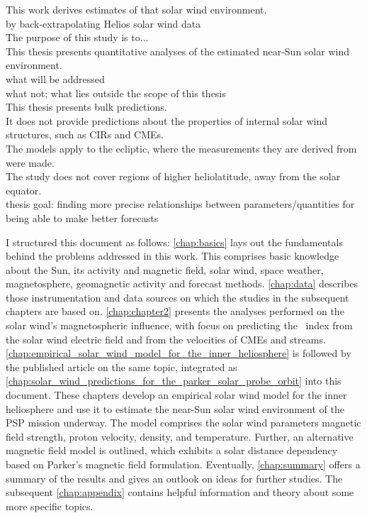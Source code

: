 
This work derives estimates of that solar wind environment.\\

by back-extrapolating Helios solar wind data\\



The purpose of this study is to...\\
This thesis presents quantitative analyses of the estimated near-Sun solar wind environment.\\

what will be addressed\\
what not; what lies outside the scope of this thesis\\
This thesis presents bulk predictions.\\
It does not provide predictions about the properties of internal solar wind structures, such as CIRs and CMEs.\\
The models apply to the ecliptic, where the measurements they are derived from were made.\\
The study does not cover regions of higher heliolatitude, away from the solar equator.\\



thesis goal: finding more precise relationships between parameters/quantities for being able to make better forecasts\\


\bigskip

I structured this document as follows: \autoref{chap:basics} lays out the fundamentals behind the problems addressed in this work. This comprises basic knowledge about the Sun, its activity and magnetic field, solar wind, space weather, magnetosphere, geomagnetic activity and forecast methods. \autoref{chap:data} describes those instrumentation and data sources on which the studies in the subsequent chapters are based on. \autoref{chap:chapter2} presents the analyses performed on the solar wind's magnetospheric influence, with focus on predicting the \Kp~index from the solar wind electric field and from the velocities of CMEs and streams. \autoref{chap:empirical_solar_wind_model_for_the_inner_heliosphere} is followed by the published article on the same topic, integrated as \autoref{chap:solar_wind_predictions_for_the_parker_solar_probe_orbit} into this document. These chapters develop an empirical solar wind model for the inner heliosphere and use it to estimate the near-Sun solar wind environment of the PSP mission underway. The model comprises the solar wind parameters magnetic field strength, proton velocity, density, and temperature. Further, an alternative magnetic field model is outlined, which exhibits a solar distance dependency based on Parker's magnetic field formulation. Eventually, \autoref{chap:summary} offers a summary of the results and gives an outlook on ideas for further studies. The subsequent \autoref{chap:appendix} contains helpful information and theory about some more specific topics.


